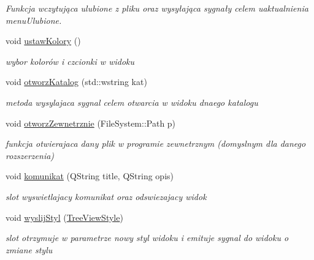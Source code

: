 \begin{DoxyCompactItemize}
\begin{DoxyCompactList}\small\item\em Funkcja wczytująca ulubione z pliku oraz wysyłająca sygnały celem uaktualnienia menuUlubione. \item\end{DoxyCompactList}\item 
\hypertarget{class_file_system_controller_aaa6260218b05b6f8f6170bce1ce6acb4}{
void \hyperlink{class_file_system_controller_aaa6260218b05b6f8f6170bce1ce6acb4}{ustawKolory} ()}
\label{class_file_system_controller_aaa6260218b05b6f8f6170bce1ce6acb4}

\begin{DoxyCompactList}\small\item\em wybor kolorów i czcionki w widoku \item\end{DoxyCompactList}\item 
void \hyperlink{class_file_system_controller_a025e7b7d1e5e53ec2e614a3a21109275}{otworzKatalog} (std::wstring kat)
\begin{DoxyCompactList}\small\item\em metoda wysylajaca sygnal celem otwarcia w widoku dnaego katalogu \item\end{DoxyCompactList}\item 
void \hyperlink{class_file_system_controller_ac192ad072e68c022020bbb71bad7812c}{otworzZewnetrznie} (FileSystem::Path p)
\begin{DoxyCompactList}\small\item\em funkcja otwierajaca dany plik w programie zewnetrznym (domyslnym dla danego rozszerzenia) \item\end{DoxyCompactList}\item 
void \hyperlink{class_file_system_controller_a063df344be005d95fed280e25414aaa3}{komunikat} (QString title, QString opis)
\begin{DoxyCompactList}\small\item\em slot wyswietlajacy komunikat oraz odswiezajacy widok \item\end{DoxyCompactList}\item 
void \hyperlink{class_file_system_controller_a3ff013fa7e0ecd324d53e9df34a6aec1}{wyslijStyl} (\hyperlink{class_tree_view_style}{TreeViewStyle})
\begin{DoxyCompactList}\small\item\em slot otrzymuje w parametrze nowy styl widoku i emituje sygnal do widoku o zmiane stylu \item\end{DoxyCompactList}\end{DoxyCompactItemize}
